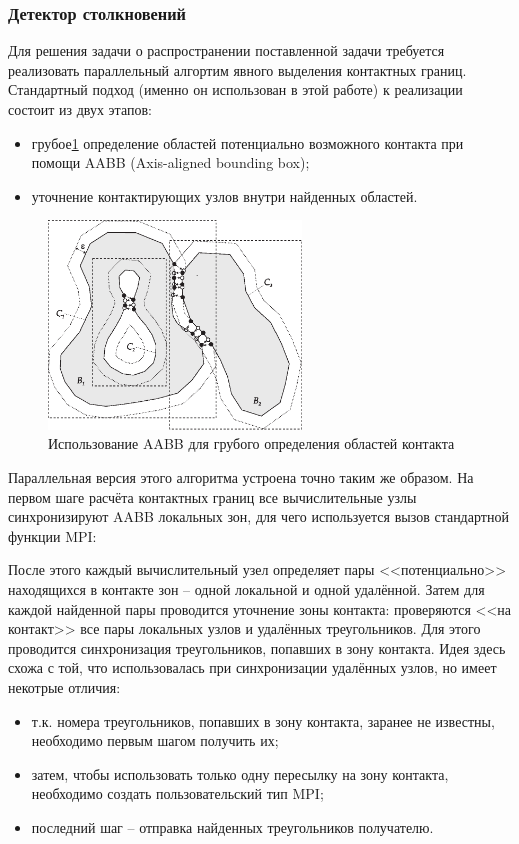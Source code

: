 \subsubsection{Детектор столкновений}
Для решения задачи о распространении поставленной задачи требуется реализовать параллельный алгортим явного выделения контактных границ. Стандартный подход (именно он использован в этой работе) к реализации состоит из двух этапов:
\begin{itemize}
	\item грубое\ref{pic:collision_detection} определение областей потенциально возможного контакта при помощи AABB (Axis-aligned bounding box);
	\item уточнение контактирующих узлов внутри найденных областей.
\end{itemize}
\begin{figure}[htp]
\centering
\includegraphics[width=0.6\textwidth]{eps/collision_detection.eps}
\caption{Использование AABB для грубого определения областей контакта}
\label{pic:collision_detection}
\end{figure}
Параллельная версия этого алгоритма устроена точно таким же образом. На первом шаге расчёта контактных границ все вычислительные узлы синхронизируют AABB локальных зон, для чего используется вызов стандартной функции MPI:

После этого каждый вычислительный узел определяет пары <<потенциально>> находящихся в контакте зон -- одной локальной и одной удалённой. Затем для каждой найденной пары проводится уточнение зоны контакта: проверяются <<на контакт>> все пары локальных узлов и удалённых треугольников. Для этого проводится синхронизация треугольников, попавших в зону контакта. Идея здесь схожа с той, что использовалась при синхронизации удалённых узлов, но имеет некотрые отличия:
\begin{itemize}
	\item т.к. номера треугольников, попавших в зону контакта, заранее не известны, необходимо первым шагом получить их;
	\item затем, чтобы использовать только одну пересылку на зону контакта, необходимо создать пользовательский тип MPI;
	\item последний шаг -- отправка найденных треугольников получателю.
\end{itemize}
